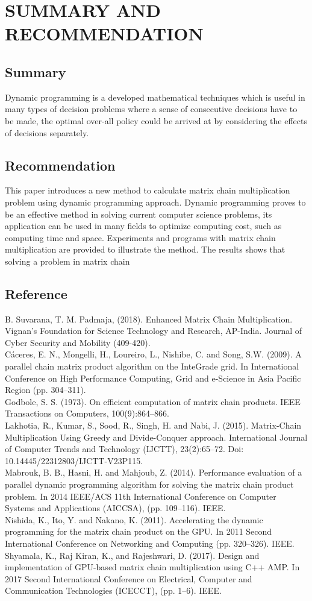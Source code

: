 \documentclass[12pt]{report}
\begin{document}
\newpage
\chapter{SUMMARY AND RECOMMENDATION}
\section{Summary}
Dynamic programming is a developed mathematical techniques which is useful in many types of decision problems where a sense of consecutive decisions have to be made, the optimal over-all policy could be arrived at by considering the effects of decisions separately.
\section{Recommendation}
This paper introduces a new method to calculate matrix chain multiplication problem using dynamic programming approach. Dynamic programming proves to be an effective method in solving current computer science problems, its application can be used in many fields to optimize computing cost, such as computing time and space. Experiments and programs with matrix chain multiplication are provided to illustrate the method. The results shows that solving a problem in matrix chain
\newpage
\section{Reference}
B. Suvarana, T. M. Padmaja, (2018). Enhanced Matrix Chain Multiplication. Vignan's Foundation for Science Technology and Research, AP-India. Journal of Cyber Security and Mobility (409-420).\\
Cáceres, E. N., Mongelli, H., Loureiro, L., Nishibe, C. and Song, S.W. (2009). A parallel chain matrix product algorithm on the InteGrade grid. In International Conference on High Performance Computing, Grid and e-Science in Asia Pacific Region (pp. 304–311).\\
Godbole, S. S. (1973). On efficient computation of matrix chain products. IEEE Transactions on Computers, 100(9):864–866.\\
Lakhotia, R., Kumar, S., Sood, R., Singh, H. and Nabi, J. (2015). Matrix-Chain Multiplication Using Greedy and Divide-Conquer approach. International Journal of Computer Trends and Technology (IJCTT), 23(2):65–72. Doi: 10.14445/22312803/IJCTT-V23P115.\\
Mabrouk, B. B., Hasni, H. and Mahjoub, Z. (2014). Performance evaluation of a parallel dynamic programming algorithm for solving the matrix chain product problem. In 2014 IEEE/ACS 11th International Conference on Computer Systems and Applications (AICCSA), (pp. 109–116). IEEE.\\
Nishida, K., Ito, Y. and Nakano, K. (2011). Accelerating the dynamic programming for the matrix chain product on the GPU. In 2011 Second International Conference on Networking and Computing (pp. 320–326). IEEE.\\
Shyamala, K., Raj Kiran, K., and Rajeshwari, D. (2017). Design and implementation of GPU-based matrix chain multiplication using C++ AMP. In 2017 Second International Conference on Electrical, Computer and Communication Technologies (ICECCT), (pp. 1–6). IEEE.\\
\end{document}
